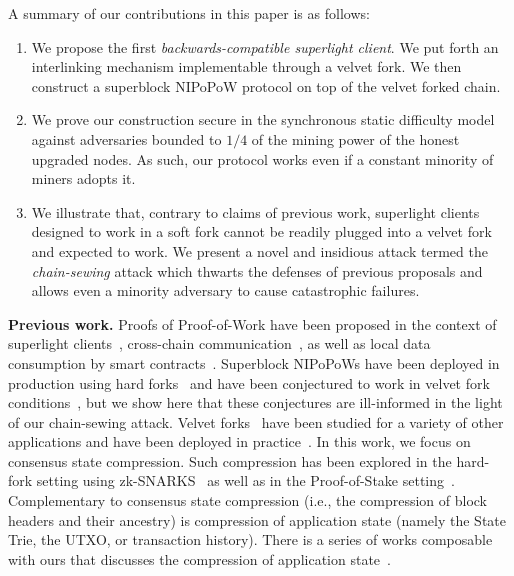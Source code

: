 A summary of our contributions in this paper is as follows:

\begin{enumerate}
  \item We propose the first \emph{backwards-compatible superlight client}. We
        put forth an interlinking mechanism implementable through a velvet fork.
        We then construct a superblock NIPoPoW protocol on top of the velvet
        forked chain.
  \item We prove our construction secure in the synchronous static difficulty
        model against adversaries bounded to $1/4$ of the mining power of the
        honest upgraded nodes. As such, our protocol works even if a constant
        minority of miners adopts it.
  \item We illustrate that, contrary to claims of previous work, superlight
        clients designed to work in a soft fork cannot be readily plugged into a
        velvet fork and expected to work. We present a novel and insidious
        attack termed the \emph{chain-sewing} attack which thwarts the defenses
        of previous proposals and allows even a minority adversary to cause
        catastrophic failures.
\end{enumerate}

\textbf{Previous work.} Proofs of Proof-of-Work have been proposed in the
context of superlight clients~\cite{pow,nipopows,flyclient},
cross-chain communication~\cite{pow-sidechains,burn,crosschain-sok}, as well as
local data consumption by smart contracts~\cite{derivatives}. Superblock
NIPoPoWs have been deployed in production using hard forks~\cite{ergo} and have
been conjectured to work in velvet fork conditions~\cite{nipopows}, but we show
here that these conjectures are ill-informed in the light of our chain-sewing
attack. Velvet forks~\cite{velvet} have been studied for a variety of other
applications and have been deployed in practice~\cite{gtklocker}. In this work,
we focus on consensus state compression. Such compression has been explored in
the hard-fork setting using zk-SNARKS~\cite{coda} as well as in the
Proof-of-Stake setting~\cite{pos-sidechains}. Complementary to consensus state
compression (i.e., the compression of block headers and their ancestry) is
compression of application state (namely the State Trie, the UTXO, or
transaction history). There is a series of works composable with ours that
discusses the compression of application state~\cite{edrax,ethanos}.

